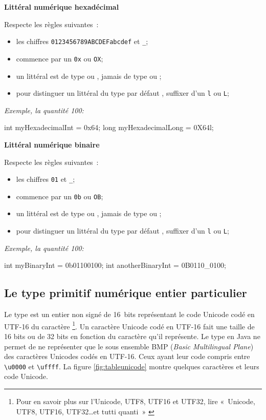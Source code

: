 \textbf{Littéral numérique hexadécimal}

Respecte les règles suivantes~:

\begin{itemize}
	\item les chiffres \texttt{0123456789ABCDEFabcdef} et \texttt{\_};
	\item commence par un \texttt{0x} ou \texttt{OX};
	\item un littéral est de type  ou , jamais de type 
		 ou ;
	\item pour distinguer un littéral  du type par défaut , suffixer 
		d'un \texttt{l} ou \texttt{L};
\end{itemize}

\textit{Exemple, la quantité 100: }
\begin{java}
	int myHexadecimalInt = 0x64;
	long myHexadecimalLong = 0X64l;
\end{java}

\clearpage
\textbf{Littéral numérique binaire}

Respecte les règles suivantes~:

\begin{itemize}
	\item les chiffres \texttt{01} et \texttt{\_};
	\item commence par un \texttt{0b} ou \texttt{OB};
	\item un littéral est de type  ou , jamais de type 
		 ou ;
	\item pour distinguer un littéral  du type par défaut , suffixer 
		d'un \texttt{l} ou \texttt{L};
\end{itemize}

\textit{Exemple, la quantité 100: } 
\begin{java}
	int myBinaryInt = 0b01100100;
	int anotherBinaryInt = 0B0110_0100;
\end{java}

\subsection{Le type primitif numérique entier particulier }

Le type  est un entier non signé de 16~bits représentant le code 
Unicode codé en UTF-16 du caractère
	\footnote{%
		Pour en savoir plus sur l'Unicode, UTF8, UTF16 et UTF32, lire
		«~Unicode, UTF8, UTF16, UTF32\ldots et tutti quanti~» \cite{pbt-unicode}
	}. 
Un caractère Unicode codé en UTF-16 fait une taille de 16 bits ou de 32 bits en
fonction du caractère qu'il représente. Le type  en Java ne permet de
ne représenter que le sous ensemble BMP (\textit{Basic Multilingual Plane}) des
caractères Unicodes codés en UTF-16. Ceux ayant leur code compris entre
\texttt{\textbackslash u0000} et \texttt{\textbackslash uffff}. La figure 
\vref{fig:tableunicode} montre quelques caractères et leurs code Unicode. 

